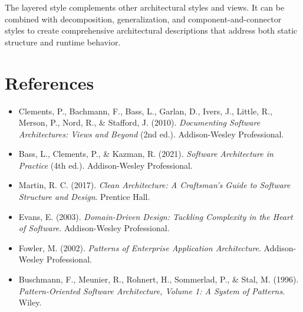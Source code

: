 \documentclass[11pt]{article}
\begin{document}
The layered style complements other architectural styles and views. It can be combined with decomposition, generalization, and component-and-connector styles to create comprehensive architectural descriptions that address both static structure and runtime behavior.

\section*{References}

\begin{itemize}
  \item Clements, P., Bachmann, F., Bass, L., Garlan, D., Ivers, J., Little, R., Merson, P., Nord, R., \& Stafford, J. (2010). \textit{Documenting Software Architectures: Views and Beyond} (2nd ed.). Addison-Wesley Professional.
  \item Bass, L., Clements, P., \& Kazman, R. (2021). \textit{Software Architecture in Practice} (4th ed.). Addison-Wesley Professional.
  \item Martin, R. C. (2017). \textit{Clean Architecture: A Craftsman's Guide to Software Structure and Design}. Prentice Hall.
  \item Evans, E. (2003). \textit{Domain-Driven Design: Tackling Complexity in the Heart of Software}. Addison-Wesley Professional.
  \item Fowler, M. (2002). \textit{Patterns of Enterprise Application Architecture}. Addison-Wesley Professional.
  \item Buschmann, F., Meunier, R., Rohnert, H., Sommerlad, P., \& Stal, M. (1996). \textit{Pattern-Oriented Software Architecture, Volume 1: A System of Patterns}. Wiley.
\end{itemize}

\listoffigures
\end{document}
